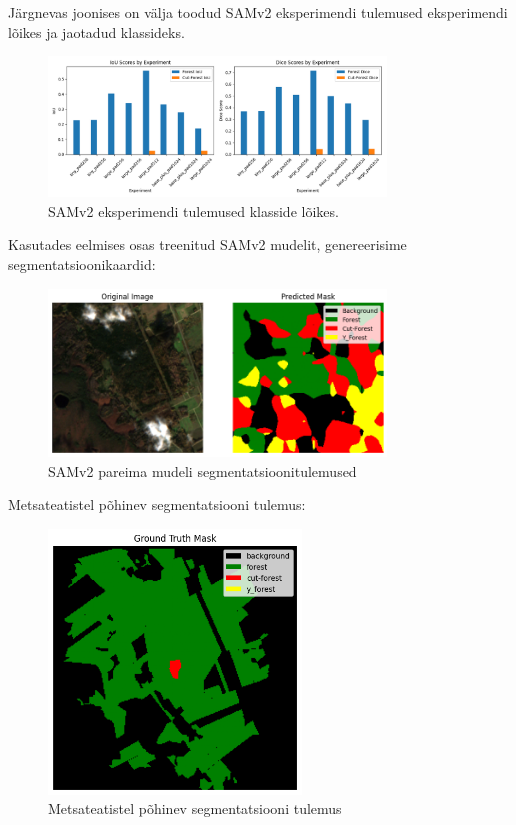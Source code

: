 Järgnevas joonises on välja toodud SAMv2 eksperimendi tulemused eksperimendi lõikes ja jaotadud klassideks.

\begin{figure}[H]
    \centering
    \includegraphics[width=0.8\textwidth]{figures/tulemused/Sam_experimentide_tulemused_klassid.png}
    \caption{SAMv2 eksperimendi tulemused klasside lõikes. }
    \label{fig:sam_result}
\end{figure}

Kasutades eelmises osas treenitud SAMv2 mudelit, genereerisime segmentatsioonikaardid:
\begin{figure}[H]
    \centering
    \includegraphics[width=0.8\textwidth]{figures/tulemused/prediction_3403037_TCI.png}
    \caption{SAMv2 pareima mudeli segmentatsioonitulemused}
    \label{fig:sam_best_result}
\end{figure}

Metsateatistel põhinev segmentatsiooni tulemus:
\begin{figure}[H]
    \centering
    \includegraphics[width=0.6\textwidth]{figures/tulemused/ground_truth_mask_3403037.png}
    \caption{Metsateatistel põhinev segmentatsiooni tulemus}
    \label{fig:actual_mask}
\end{figure}



